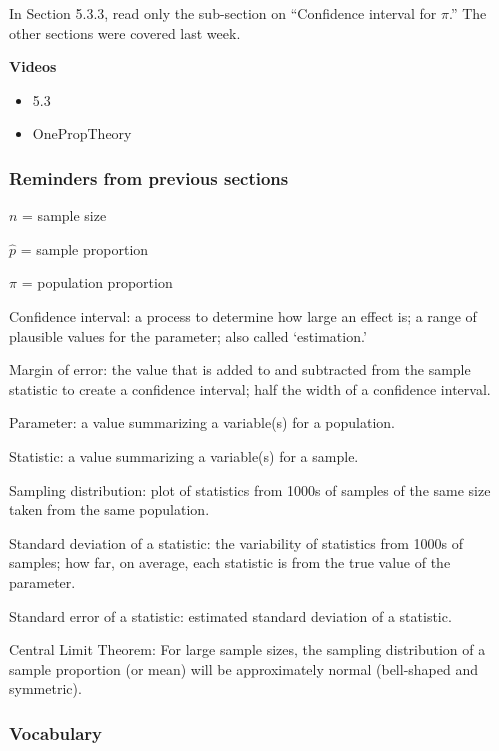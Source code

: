 \documentclass[
]{report}
\providecommand{\tightlist}{%
  \setlength{\itemsep}{0pt}\setlength{\parskip}{0pt}}
\begin{document}

In Section 5.3.3, read only the sub-section on ``Confidence interval for \(\pi\).'' The other sections were covered last week.

\newpage

\textbf{Videos}

\begin{itemize}
\tightlist
\item
  5.3
\item
  OnePropTheory
\end{itemize}


\hypertarget{reminders-from-previous-sections-1}{%
\subsubsection*{Reminders from previous sections}\label{reminders-from-previous-sections-1}}

\(n\) = sample size

\(\hat{p}\) = sample proportion

\(\pi\) = population proportion

Confidence interval: a process to determine how large an effect is; a range of plausible values for the parameter; also called `estimation.'

Margin of error: the value that is added to and subtracted from the sample statistic to create a confidence interval; half the width of a confidence interval.

Parameter: a value summarizing a variable(s) for a population.

Statistic: a value summarizing a variable(s) for a sample.

Sampling distribution: plot of statistics from 1000s of samples of the same size taken from the same population.

Standard deviation of a statistic: the variability of statistics from 1000s of samples; how far, on average, each statistic is from the true value of the parameter.

Standard error of a statistic: estimated standard deviation of a statistic.

Central Limit Theorem: For large sample sizes, the sampling distribution of a sample proportion (or mean) will be approximately normal (bell-shaped and symmetric).

\hypertarget{vocabulary-14}{%
\subsubsection*{Vocabulary}\label{vocabulary-14}}
\end{document}
